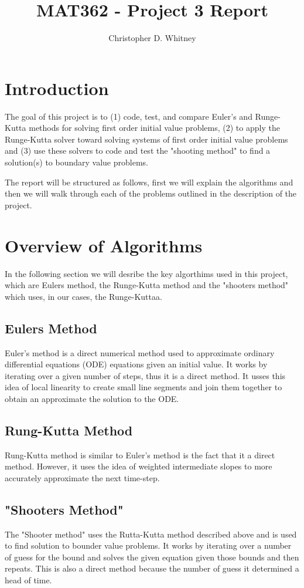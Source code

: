 \documentclass{article}
\begin{document}
\title{MAT362 - Project 3 Report}
\author{Christopher D. Whitney}

\maketitle

\section*{Introduction}
The goal of this project is to (1) code, test, and compare Euler’s and Runge-Kutta methods for solving first order initial value problems, (2) to apply the Runge-Kutta solver toward solving systems of first order initial value problems and (3) use these solvers to code and test the "shooting method" to find a solution(s) to boundary value problems.

The report will be structured as follows, first we will explain the algorithms and then we will walk through each of the problems outlined in the description of the project.

\section*{Overview of Algorithms}
In the following section we will desribe the key algorthims used in this project, which are Eulers method, the Runge-Kutta method and the "shooters method" which uses, in our cases, the Runge-Kuttaa.

\subsection*{Eulers Method}
Euler's method is a direct numerical method used to approximate ordinary differential equations (ODE) equations given an initial value. It works by iterating over a given number of steps, thus it is a direct method. It usses this idea of local linearity  to create small line segments and join them together to obtain an approximate the solution to the ODE. 
 
\subsection*{Rung-Kutta Method}
Rung-Kutta method is similar to Euler's method is the fact that it a direct method. However, it uses the idea of weighted intermediate slopes to more accurately approximate the next time-step. 

\subsection*{"Shooters Method"}
The "Shooter method" uses the Rutta-Kutta method described above and is used to find solution to bounder value problems. It works by iterating over a number of guess for the bound and solves the given equation given those bounds and then repeats. This is also a direct method because the number of guess it determined a head of time. 
\end{document}
